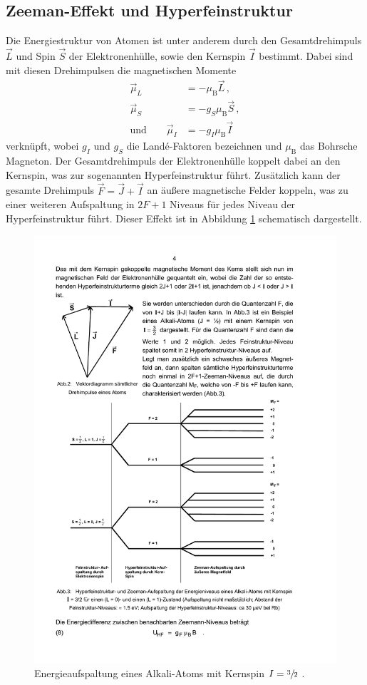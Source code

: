 \subsection{Zeeman-Effekt und Hyperfeinstruktur}
\label{subsec:zeemanneffekt_und_hyperfeinstruktur}
Die Energiestruktur von Atomen ist unter anderem durch den Gesamtdrehimpuls
$\vec{L}$ und Spin $\vec{S}$ der Elektronenhülle, sowie den Kernspin $\vec{I}$
bestimmt. Dabei sind mit diesen Drehimpulsen die magnetischen Momente
\begin{align}
    \vec{\mu}_L &= -\mu_\text{B}\vec{L}\,,
        \label{eq:magn_moment_elektronen}\\
    \vec{\mu}_S &= -g_S\mu_\text{B}\vec{S}\,,
        \label{eq:magn_moment_espin}\\
    \text{und}\qquad\vec{\mu}_I &= -g_I\mu_\text{B}\vec{I}
        \label{eq:magn_moment_kernspin}
\end{align}
verknüpft, wobei $g_I$ und $g_S$ die Landé-Faktoren bezeichnen und
$\mu_\text{B}$ das Bohrsche Magneton.
Der Gesamtdrehimpuls der Elektronenhülle koppelt dabei an den Kernspin,
was zur sogenannten Hyperfeinstruktur führt.
Zusätzlich kann der gesamte Drehimpuls $\vec{F} = \vec{J} + \vec{I}$ an äußere
magnetische Felder koppeln, was zu einer weiteren Aufspaltung in $\num{2}F +
\num{1}$ Niveaus für jedes Niveau der Hyperfeinstruktur führt.
Dieser Effekt ist in Abbildung \ref{fig:aufspaltung} schematisch dargestellt.
\begin{figure}
    \centering
    \includegraphics[width=0.8\linewidth]{img/aufspaltung.pdf}
    \caption{
        Energieaufspaltung eines Alkali-Atoms mit Kernspin $I=\sfrac{3}{2}$
        \cite{V21}.
    }
    \label{fig:aufspaltung}
\end{figure}
